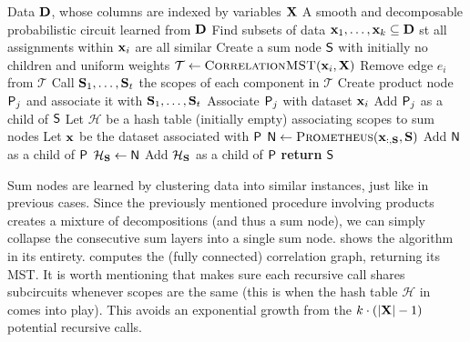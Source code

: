 \begin{algorithm}[t]
  \caption{}\label{alg:prometheus}
  \begin{algorithmic}[1]
    \Require Data $\mathbf{D}$, whose columns are indexed by variables $\mathbf{X}$
    \Ensure A smooth and decomposable probabilistic circuit learned from $\mathbf{D}$
    \NIElse
      \State Find subsets of data $\mathbf{x}_1,\ldots,\mathbf{x}_k\subseteq\mathbf{D}$ st all assignments
        within $\mathbf{x}_i$ are all similar
      \State Create a sum node $\operatorname{\textup{\textsf{S}}}$ with initially no children and uniform weights
        \State $\mathcal{T}\gets\textproc{CorrelationMST}(\set{x}_i,\set{X})$
          \State Remove edge $e_i$ from $\mathcal{T}$
          \State Call $\mathbf{S}_1,\ldots,\mathbf{S}_t$ the scopes of each component in $\mathcal{T}$
          \State Create product node $\operatorname{\textup{\textsf{P}}}_j$ and associate it with $\mathbf{S}_1,\ldots,\mathbf{S}_t$
          \State Associate $\operatorname{\textup{\textsf{P}}}_j$ with dataset $\mathbf{x}_i$
          \State Add $\operatorname{\textup{\textsf{P}}}_j$ as a child of $\operatorname{\textup{\textsf{S}}}$
        \EndFor
      \EndFor
      \State Let $\mathcal{H}$ be a hash table (initially empty) associating scopes to sum nodes
            \State Let $\mathbf{x}$ be the dataset associated with $\operatorname{\textup{\textsf{P}}}$
            \State $\Node\gets\textproc{Prometheus}(\set{x}_{:,\set{S}},\set{S})$
            \State Add $\operatorname{\textup{\textsf{N}}}$ as a child of $\operatorname{\textup{\textsf{P}}}$
            \State $\mathcal{H}_{\mathbf{S}}\gets\operatorname{\textup{\textsf{N}}}$
          \Else
            \State Add $\mathcal{H}_{\mathbf{S}}$ as a child of $\operatorname{\textup{\textsf{P}}}$
          \EndIf
        \EndFor
      \EndFor
      \State \textbf{return} $\operatorname{\textup{\textsf{S}}}$
    \EndNIElse
  \end{algorithmic}
\end{algorithm}

Sum nodes are learned by clustering data into similar instances, just like in previous cases. Since
the previously mentioned procedure involving products creates a mixture of decompositions (and thus
a sum node), we can simply collapse the consecutive sum layers into a single sum node.
 shows the algorithm in its entirety.  computes the
(fully connected) correlation graph, returning its MST. It is worth mentioning that
 makes sure each recursive call shares subcircuits whenever scopes are the
same (this is when the hash table $\mathcal{H}$ in  comes into play). This
avoids an exponential growth from the $k\cdot(|\mathbf{X}|-1)$ potential recursive calls.

